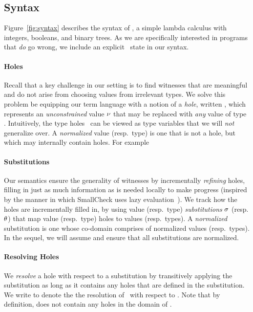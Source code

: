 \subsection{Syntax}
\label{sec:syntax}

%
Figure~\ref{fig:syntax} describes the syntax of \lang, a simple lambda
calculus with integers, booleans, and binary trees.
%
As we are specifically interested in programs that \emph{do} go wrong,
we include an explicit \stuck\ state in our syntax.

\paragraph{Holes}
\label{sec:holes}
%
Recall that a key challenge in our setting is to find witnesses
that are meaningful and do not arise from choosing values from
irrelevant types.
%
We solve this problem be equipping our term language with a
notion of a \emph{hole}, written \vhole{\thole}, which represents
an \emph{unconstrained} value $\nu$ that may be replaced with
\emph{any} value of type \thole.
%
Intuitively, the type holes \thole\ can be viewed as type variables
that we will \emph{not} generalize over.
%
A \emph{normalized} value (resp.\ type) is one that is not a hole,
but which may internally contain holes.
%
For example 

\paragraph{Substitutions}
%
Our semantics ensure the generality of witnesses by incrementally
\emph{refining} holes, filling in just as much information as is
needed locally to make progress (inspired by the manner in
which SmallCheck uses lazy evaluation~\cite{runciman_smallcheck_2008}).
%
We track how the holes are incrementally filled in, by using
value (resp.\ type) \emph{substitutions} $\sigma$ (resp. $\theta$)
that map value (resp.\ type) holes to values (resp.\ types).
%
A \emph{normalized} substitution is one whose co-domain comprises
of normalized values (resp.\ types).
%
In the sequel, we will assume and ensure that all substitutions
are normalized.

\paragraph{Resolving Holes}
We \emph{resolve} a hole with respect to a substitution by
transitively applying the substitution as long as it contains
any holes that are defined in the substitution.
%
We write \resolve{\thole}{\tsu} to denote the the resolution
of \thole\ with respect to \tsu.
%
Note that by definition, \resolve{\thole}{\tsu} does not contain
any holes in the domain of \tsu.


